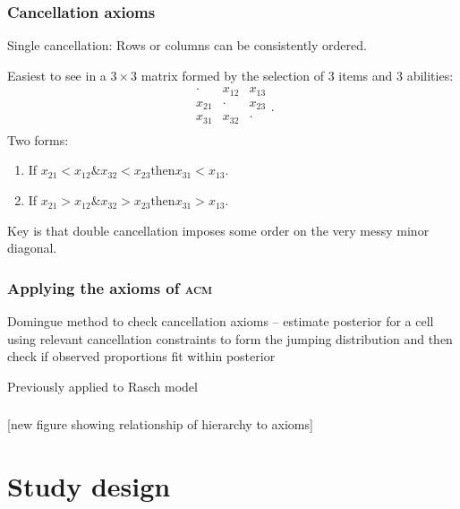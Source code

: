 \documentclass[10pt,serif,professionalfont]{beamer}
\begin{document}
\begin{frame} %
    \frametitle{Cancellation axioms}
    Single cancellation: Rows or columns can be consistently ordered.%

Easiest to see in a $3 \times 3$ matrix formed by the selection of 3 items and 3 abilities:
\[
\begin{array}{ccc}
  \cdot&x_{12} &x_{13}  \\
  x_{21}&\cdot&x_{23} \\
  x_{31} & x_{32}&\cdot\\
\end{array}.
\]
Two forms:
\begin{enumerate}
\item If $x_{21}<x_{12} \& x_{32}<x_{23} \text{then} x_{31}<x_{13}$.
\item If $x_{21}>x_{12} \& x_{32}>x_{23} \text{then} x_{31}>x_{13}$.
\end{enumerate}
Key is that double cancellation imposes some order on the very messy minor diagonal.

\end{frame}

\begin{frame}
    \frametitle{Applying the axioms of \textsc{acm}}

    Domingue method to check cancellation axioms -- estimate posterior for a cell using relevant cancellation constraints to form the jumping distribution and then check if observed proportions fit within posterior%

    Previously applied to Rasch model

\end{frame}

\begin{frame}
    \frametitle{}

    [new figure showing relationship of hierarchy to axioms]

\end{frame}

\begin{frame}
    \frametitle{}

\end{frame}


\section{Study design}
\end{document}
